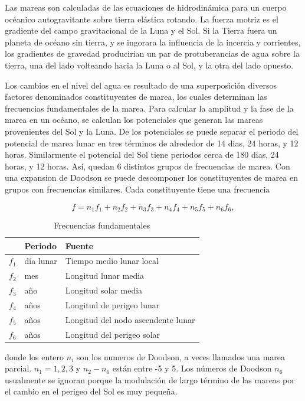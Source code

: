 \documentclass[paper=letter, fontsize=12pt,spanish]{article}
\begin{document}
Las mareas son calculadas de las ecuaciones de hidrodinámica para un cuerpo océanico autogravitante sobre tierra elástica rotando. La fuerza motriz es el gradiente del campo gravitacional de la Luna y el Sol. Si la Tierra fuera un planeta de océano sin tierra, y se ingorara la influencia de la incercia y corrientes, los gradientes de gravedad producirian un par de protuberancias de agua sobre la tierra, una del lado volteando hacia la Luna o al Sol, y la otra del lado opuesto.

Los cambios en el nivel del agua es resultado de una superposición diversos factores denominados constituyentes de marea, los cuales determinan las frecuencias fundamentales de la marea.
Para calcular la amplitud y la fase de la marea en un océano, se calculan los potenciales que generan las mareas provenientes del Sol y la Luna. De los potenciales se puede separar el periodo del potencial de marea lunar en tres términos de alrededor de 14 dias, 24 horas, y 12 horas. Similarmente el potencial del Sol tiene periodos cerca de 180 dias, 24 horas, y 12 horas. Así, quedan 6 distintos grupos de frecuencias de marea.
Con una expansion de Doodson se puede descomponer los constituyentes de marea en grupos con frecuencias similares. Cada constituyente tiene una frecuencia 

\begin{equation}
\label{eq1}
f = n_1 f_1 + n_2 f_2 + n_3 f_3 + n_4 f_4 + n_5 f_5 + n_6 f_6, 
\end{equation}


\begin{table}
\centering 
\begin{tabular}{l l l }
\toprule
     & 	Periodo  	& Fuente\\
\midrule
$f_1$&	d\'ia lunar	& Tiempo medio lunar local\\
$f_2$&	mes		& Longitud lunar media\\
$f_3$& año	& Longitud solar media\\
$f_4$&	años	& Longitud de perigeo lunar\\
$f_5$& años & Longitud del nodo ascendente lunar\\
$f_6$& años & Longitud del perigeo solar\\
\bottomrule 

 \end{tabular}
\caption {Frecuencias fundamentales} \label{tab:title} 
\end{table}

donde los entero $n_i$ son los numeros de Doodson, a veces llamados una marea parcial. $n_1 = 1,2,3$ y $n_2-n_6$ están entre -5 y 5. Los números de Doodson $n_6$ usualmente se ignoran porque la modulación de largo término de las mareas por el cambio en el perigeo del Sol es muy pequeña.
\end{document}
